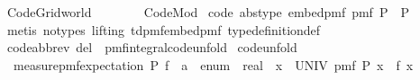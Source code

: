 %
\begin{isabellebody}%
%
%
\isadelimtheory
\isanewline
\isanewline
%
\endisadelimtheory
%
\isatagtheory
{}\isamarkupfalse%
\ Code{\isacharunderscore}{\kern0pt}Gridworld\isanewline
\ \ \ \isanewline
\ \ \ \ Code{\isacharunderscore}{\kern0pt}Mod\isanewline
{}%
\endisatagtheory
{\isafoldtheory}%
%
\isadelimtheory
%
\endisadelimtheory
%
\isadelimdocument
%
\endisadelimdocument
%
\isatagdocument
%
\isamarkuptrue%
%
\endisatagdocument
{\isafolddocument}%
%
\isadelimdocument
%
\endisadelimdocument
{}\isamarkupfalse%
\ {\isacharbrackleft}{\kern0pt}code\ abstype{\isacharbrackright}{\kern0pt}{\isacharcolon}{\kern0pt}\ {\isachardoublequoteopen}embed{\isacharunderscore}{\kern0pt}pmf\ {\isacharparenleft}{\kern0pt}pmf\ P{\isacharparenright}{\kern0pt}\ {\isacharequal}{\kern0pt}\ P{\isachardoublequoteclose}\isanewline
%
\isadelimproof
\ \ %
\endisadelimproof
%
\isatagproof
{}\isamarkupfalse%
\ {\isacharparenleft}{\kern0pt}metis\ {\isacharparenleft}{\kern0pt}no{\isacharunderscore}{\kern0pt}types{\isacharcomma}{\kern0pt}\ lifting{\isacharparenright}{\kern0pt}\ td{\isacharunderscore}{\kern0pt}pmf{\isacharunderscore}{\kern0pt}embed{\isacharunderscore}{\kern0pt}pmf\ type{\isacharunderscore}{\kern0pt}definition{\isacharunderscore}{\kern0pt}def{\isacharparenright}{\kern0pt}%
\endisatagproof
{\isafoldproof}%
%
\isadelimproof
\isanewline
%
\endisadelimproof
\isanewline
{}\isamarkupfalse%
\ {\isacharbrackleft}{\kern0pt}code{\isacharunderscore}{\kern0pt}abbrev\ del{\isacharbrackright}{\kern0pt}\ {\isacharequal}{\kern0pt}\ pmf{\isacharunderscore}{\kern0pt}integral{\isacharunderscore}{\kern0pt}code{\isacharunderscore}{\kern0pt}unfold\isanewline
\isanewline
{}\isamarkupfalse%
\ {\isacharbrackleft}{\kern0pt}code{\isacharunderscore}{\kern0pt}unfold{\isacharbrackright}{\kern0pt}{\isacharcolon}{\kern0pt}\ \isanewline
\ \ {\isachardoublequoteopen}measure{\isacharunderscore}{\kern0pt}pmf{\isachardot}{\kern0pt}expectation\ P\ {\isacharparenleft}{\kern0pt}f\ {\isacharcolon}{\kern0pt}{\isacharcolon}{\kern0pt}\ {\isacharprime}{\kern0pt}a\ {\isacharcolon}{\kern0pt}{\isacharcolon}{\kern0pt}\ enum\ {\isasymRightarrow}\ real{\isacharparenright}{\kern0pt}\ {\isacharequal}{\kern0pt}\ {\isacharparenleft}{\kern0pt}{\isasymSum}x\ {\isasymin}\ UNIV{\isachardot}{\kern0pt}\ pmf\ P\ x\ {\isacharasterisk}{\kern0pt}\ f\ x{\isacharparenright}{\kern0pt}{\isachardoublequoteclose}\isanewline

\end{isabellebody}
